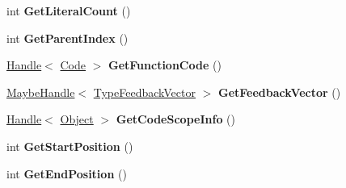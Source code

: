 \begin{DoxyCompactItemize}
\item 
int {\bfseries Get\+Literal\+Count} ()\hypertarget{classv8_1_1internal_1_1_function_info_wrapper_a8e6890d255e00360984851dd35f433b6}{}\label{classv8_1_1internal_1_1_function_info_wrapper_a8e6890d255e00360984851dd35f433b6}

\item 
int {\bfseries Get\+Parent\+Index} ()\hypertarget{classv8_1_1internal_1_1_function_info_wrapper_ab22424b5da20f152118ad9ffb1f11182}{}\label{classv8_1_1internal_1_1_function_info_wrapper_ab22424b5da20f152118ad9ffb1f11182}

\item 
\hyperlink{classv8_1_1internal_1_1_handle}{Handle}$<$ \hyperlink{classv8_1_1internal_1_1_code}{Code} $>$ {\bfseries Get\+Function\+Code} ()\hypertarget{classv8_1_1internal_1_1_function_info_wrapper_ae152d0223c233556c870d66824ee3a99}{}\label{classv8_1_1internal_1_1_function_info_wrapper_ae152d0223c233556c870d66824ee3a99}

\item 
\hyperlink{classv8_1_1internal_1_1_maybe_handle}{Maybe\+Handle}$<$ \hyperlink{classv8_1_1internal_1_1_type_feedback_vector}{Type\+Feedback\+Vector} $>$ {\bfseries Get\+Feedback\+Vector} ()\hypertarget{classv8_1_1internal_1_1_function_info_wrapper_a685dfd16b8f5e2ae7d5c536784ef3615}{}\label{classv8_1_1internal_1_1_function_info_wrapper_a685dfd16b8f5e2ae7d5c536784ef3615}

\item 
\hyperlink{classv8_1_1internal_1_1_handle}{Handle}$<$ \hyperlink{classv8_1_1internal_1_1_object}{Object} $>$ {\bfseries Get\+Code\+Scope\+Info} ()\hypertarget{classv8_1_1internal_1_1_function_info_wrapper_a4b499303b47ca2fa5cc987462dd55cf9}{}\label{classv8_1_1internal_1_1_function_info_wrapper_a4b499303b47ca2fa5cc987462dd55cf9}

\item 
int {\bfseries Get\+Start\+Position} ()\hypertarget{classv8_1_1internal_1_1_function_info_wrapper_abefb70c902e8876a47eae6d00a17064e}{}\label{classv8_1_1internal_1_1_function_info_wrapper_abefb70c902e8876a47eae6d00a17064e}

\item 
int {\bfseries Get\+End\+Position} ()\hypertarget{classv8_1_1internal_1_1_function_info_wrapper_a98cd005845e93b62b4d36d73e15dbdc6}{}\label{classv8_1_1internal_1_1_function_info_wrapper_a98cd005845e93b62b4d36d73e15dbdc6}

\end{DoxyCompactItemize}
